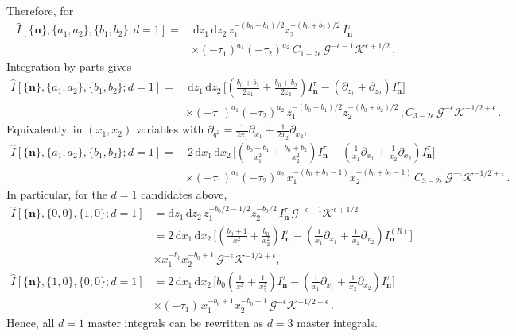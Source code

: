 \documentclass[%
 reprint,
 amsmath,amssymb,
 aps,
prd,
]{revtex4-2}
\newcommand{\n}{\nonumber}
\def\di{{\mathrm{d}}}
\def\ep{\epsilon}
\newcommand{\mG}{\mathcal{G}}
\newcommand{\mK}{\mathcal{K}}
\begin{document}
\begin{widetext}
Therefore, for
\begin{align}
	\hat{I}[\{\bm n\},\{a_1,a_2\},\{b_1,b_2\};d=1]
	=&~\di z_1\,\di z_2\,z_1^{-(b_0+b_1)/2}z_2^{-(b_0+b_2)/2}\,I^{\tau}_{\bm n}\,\n\\
	&\times (-\tau_1)^{a_1}(-\tau_2)^{a_2}\,C_{1-2\ep}\,\mG^{-\ep-1}\mK^{\ep+1/2}\,,
\end{align}
Integration by parts gives
\begin{align}
	\hat{I}[\{\bm n\},\{a_1,a_2\},\{b_1,b_2\};d=1]
	=&~\di z_1\,\di z_2\,\Bigg[\left(\frac{b_0+b_1}{2z_1}+\frac{b_0+b_2}{2z_2}\right)I^{\tau}_{\bm n}
	-\left(\partial_{z_1}+\partial_{z_2}\right)I^{\tau}_{\bm n}\Bigg] \n\\
	&\times (-\tau_1)^{a_1}(-\tau_2)^{a_2}\,z_1^{-(b_0+b_1)/2}z_2^{-(b_0+b_2)/2}\,,
	C_{3-2\ep}\,\mG^{-\ep}\mK^{-1/2+\ep}\,.
\end{align}
Equivalently, in $(x_1,x_2)$ variables with $\partial_{q^2}=\frac{1}{2x_1}\partial_{x_1}+\frac{1}{2x_2}\partial_{x_2}$,
\begin{align}
	\hat{I}[\{\bm n\},\{a_1,a_2\},\{b_1,b_2\};d=1]
	=&~2\,\di x_1\,\di x_2\,\Bigg[\left(\frac{b_0+b_1}{x_1^2}+\frac{b_0+b_2}{x_2^2}\right)I^{\tau}_{\bm n}
	-\left(\frac{1}{x_1}\partial_{x_1}+\frac{1}{x_2}\partial_{x_2}\right)I^{\tau}_{\bm n}\Bigg] \n\\
	&\times (-\tau_1)^{a_1}(-\tau_2)^{a_2}\,x_1^{-(b_0+b_1-1)}x_2^{-(b_0+b_2-1)} \,
	C_{3-2\ep}\,\mG^{-\ep}\mK^{-1/2+\ep}\,.
\end{align}
In particular, for the $d=1$ candidates above,
\begin{align}
	\hat{I}[\{\bm n\},\{0,0\},\{1,0\};d=1]
	&= \di z_1\,\di z_2\,z_1^{-b_0/2-1/2}z_2^{-b_0/2}\,I^{\tau}_{\bm n}\,\mG^{-\ep-1}\mK^{\ep+1/2} \n\\
	&=2\,\di x_1\,\di x_2\,\Bigg[\left(\frac{b_{0}+1}{x_1^2}+\frac{b_{0}}{x_2^2}\right)I^{\tau}_{\bm n}
	-\left(\frac{1}{x_1}\partial_{x_1}+\frac{1}{x_2}\partial_{x_2}\right)I^{(R)}_{\bm n}\Bigg]\n\\
	&\times x_1^{-b_0}x_2^{-b_0+1}\,\mG^{-\ep}\mK^{-1/2+\ep}, \n\\
	\hat{I}[\{\bm n\},\{1,0\},\{0,0\};d=1]
	&=2\,\di x_1\,\di x_2\,\Bigg[b_0\left(\frac{1}{x_1^2}+\frac{1}{x_2^2}\right)I^{\tau}_{\bm n}
	-\left(\frac{1}{x_1}\partial_{x_1}+\frac{1}{x_2}\partial_{x_2}\right)I^{\tau}_{\bm n}\Bigg]\n\\
	&\times (-\tau_1)\,x_1^{-b_0+1}x_2^{-b_0+1}\,\mG^{-\ep}\mK^{-1/2+\ep}\,.
\end{align}
Hence, all $d=1$ master integrals can be rewritten as $d=3$ master integrals.

\end{widetext}
\end{document}
